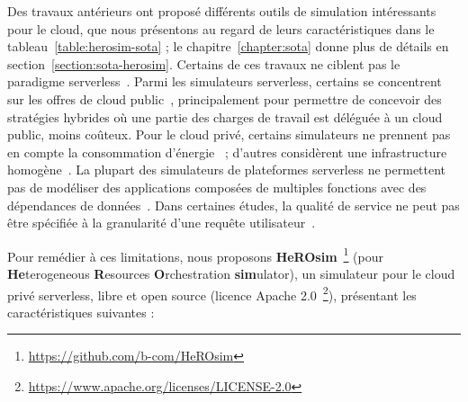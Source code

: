 Des travaux antérieurs ont proposé différents outils de simulation intéressants pour le cloud, que nous présentons au regard de leurs caractéristiques dans le tableau~\ref{table:herosim-sota} ; le chapitre~\ref{chapter:sota} donne plus de détails en section~\ref{section:sota-herosim}. Certains de ces travaux ne ciblent pas le paradigme serverless~\cite{calheiros_cloudsim_2011, wickremasinghe_cloudanalyst_2010, cai_elasticsim_2017, buyyaGridSimToolkitModeling2002, nunez_icancloud_2012, mahmudIFogSim2ExtendedIFogSim2021}. Parmi les simulateurs serverless, certains se concentrent sur les offres de cloud public~\cite{nunez_icancloud_2012, mahmoudiSimFaaSPerformanceSimulator2021}, principalement pour permettre de concevoir des stratégies hybrides où une partie des charges de travail est déléguée à un cloud public, moins coûteux. Pour le cloud privé, certains simulateurs ne prennent pas en compte la consommation d'énergie~\cite{jeonCloudSimExtensionSimulatingDistributed2019, cai_elasticsim_2017, buyyaGridSimToolkitModeling2002, nunez_icancloud_2012} ; d'autres considèrent une infrastructure homogène~\cite{jeonCloudSimExtensionSimulatingDistributed2019, nunez_icancloud_2012, mahmoudiSimFaaSPerformanceSimulator2021}. La plupart des simulateurs de plateformes serverless ne permettent pas de modéliser des applications composées de multiples fonctions avec des dépendances de données~\cite{calheiros_cloudsim_2011, mampage_cloudsimsc_2023, wickremasinghe_cloudanalyst_2010, jeonCloudSimExtensionSimulatingDistributed2019, buyyaGridSimToolkitModeling2002, nunez_icancloud_2012, mahmudIFogSim2ExtendedIFogSim2021}. Dans certaines études, la qualité de service ne peut pas être spécifiée à la granularité d'une requête utilisateur~\cite{calheiros_cloudsim_2011, mampage_cloudsimsc_2023, wickremasinghe_cloudanalyst_2010, cai_elasticsim_2017, nunez_icancloud_2012, mahmudIFogSim2ExtendedIFogSim2021, mastenbroekOpenDCConvenientModeling2021, mahmoudiSimFaaSPerformanceSimulator2021}.

Pour remédier à ces limitations, nous proposons \textbf{HeROsim}~\footnote{\href{https://github.com/b-com/HeROsim}{https://github.com/b-com/HeROsim}} (pour \textbf{He}terogeneous \textbf{R}esources \textbf{O}rchestration \textbf{sim}ulator), un simulateur pour le cloud privé serverless, libre et open source (licence Apache 2.0~\footnote{\href{https://www.apache.org/licenses/LICENSE-2.0}{https://www.apache.org/licenses/LICENSE-2.0}}), présentant les caractéristiques suivantes :

